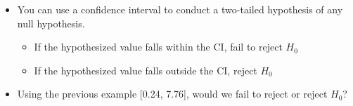 \documentclass[12pt]{article}
\begin{document}
\begin{itemize}
\itemsep1pt\parskip0pt
\item
  You can use a confidence interval to conduct a two-tailed hypothesis
  of any null hypothesis.

  \begin{itemize}
  \itemsep1pt\parskip0pt
  \item
    If the hypothesized value falls within the CI, fail to reject
    \(H_{0}\)
  \item
    If the hypothesized value falls outside the CI, reject \(H_{0}\)
  \end{itemize}
\item
  Using the previous example {[}0.24, 7.76{]}, would we fail to reject
  or reject \(H_{0}\)?
\end{itemize}
\end{document}
